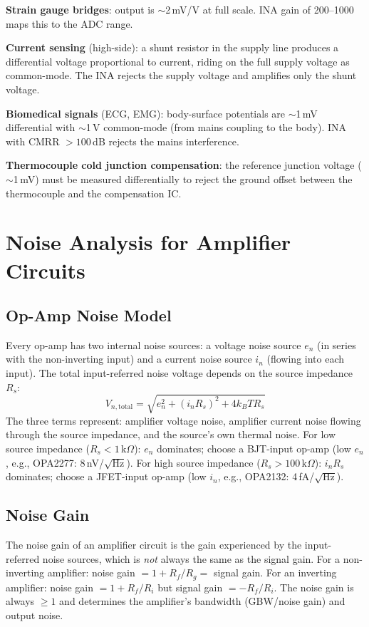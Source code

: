 \documentclass[11pt,letterpaper,twoside,openany]{book}
\begin{document}
\textbf{Strain gauge bridges}: output is $\sim$2\,mV/V at full scale. INA gain of 200--1000 maps this to the ADC range.

\textbf{Current sensing} (high-side): a shunt resistor in the supply line produces a differential voltage proportional to current, riding on the full supply voltage as common-mode. The INA rejects the supply voltage and amplifies only the shunt voltage.

\textbf{Biomedical signals} (ECG, EMG): body-surface potentials are $\sim$1\,mV differential with $\sim$1\,V common-mode (from mains coupling to the body). INA with CMRR $> 100$\,dB rejects the mains interference.

\textbf{Thermocouple cold junction compensation}: the reference junction voltage ($\sim$1\,mV) must be measured differentially to reject the ground offset between the thermocouple and the compensation IC.
\section{Noise Analysis for Amplifier Circuits}
\subsection{Op-Amp Noise Model}
Every op-amp has two internal noise sources: a voltage noise source $e_n$ (in series with the non-inverting input) and a current noise source $i_n$ (flowing into each input). The total input-referred noise voltage depends on the source impedance $R_s$:
\begin{equation}
V_{n,\text{total}} = \sqrt{e_n^2 + (i_n R_s)^2 + 4k_B T R_s}
\end{equation}
The three terms represent: amplifier voltage noise, amplifier current noise flowing through the source impedance, and the source's own thermal noise. For low source impedance ($R_s < 1$\,k$\Omega$): $e_n$ dominates; choose a BJT-input op-amp (low $e_n$, e.g., OPA2277: 8\,nV/$\sqrt{\text{Hz}}$). For high source impedance ($R_s > 100$\,k$\Omega$): $i_n R_s$ dominates; choose a JFET-input op-amp (low $i_n$, e.g., OPA2132: 4\,fA/$\sqrt{\text{Hz}}$).

\subsection{Noise Gain}
The noise gain of an amplifier circuit is the gain experienced by the input-referred noise sources, which is \emph{not} always the same as the signal gain. For a non-inverting amplifier: noise gain $= 1 + R_f/R_g = $ signal gain. For an inverting amplifier: noise gain $= 1 + R_f/R_i$ but signal gain $= -R_f/R_i$. The noise gain is always $\geq 1$ and determines the amplifier's bandwidth (GBW/noise gain) and output noise.
\end{document}
